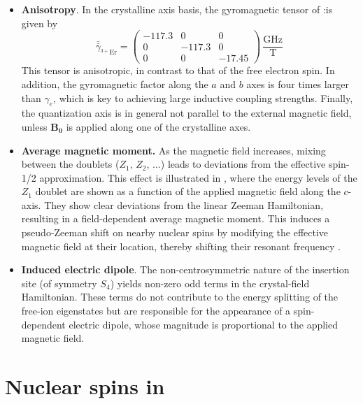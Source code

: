 \begin{itemize}
    \item \textbf{Anisotropy}. In the crystalline axis basis, the gyromagnetic tensor of \Er:\Ca is given by
    \[
         \bar{\bar{\gamma}}_{^{3+}\text{Er}} = \begin{pmatrix}
            -117.3 & 0 & 0 \\
            0 & -117.3 & 0 \\
            0 & 0 & -17.45
         \end{pmatrix}\,\frac{\text{GHz}}{\text{T}}
    \]
    This tensor is anisotropic, in contrast to that of the free electron spin. In addition, the gyromagnetic factor along the $a$ and $b$ axes is four times larger than $\gamma_e$, which is key to achieving large inductive coupling strengths. Finally, the quantization axis is in general not parallel to the external magnetic field, unless $\mathbf{B_0}$ is applied along one of the crystalline axes.
    \item \textbf{Average magnetic moment.}  As the magnetic field increases, mixing between the doublets ($Z_1,\,Z_2,\,\dots$) leads to deviations from the effective spin-1/2 approximation. This effect is illustrated in , where the energy levels of the $Z_1$ doublet are shown as a function of the applied magnetic field along the $c$-axis. They show clear deviations from the linear Zeeman Hamiltonian, resulting in a field-dependent average magnetic moment. This induces a pseudo-Zeeman shift on nearby nuclear spins by modifying the effective magnetic field at their location, thereby shifting their resonant frequency .

    \item \textbf{Induced electric dipole}. The non-centrosymmetric nature of the insertion site (of symmetry $S_4$) yields non-zero odd terms in the crystal-field Hamiltonian. These terms do not contribute to the energy splitting of the free-ion eigenstates but are responsible for the appearance of a spin-dependent electric dipole, whose magnitude is proportional to the applied magnetic field.
\end{itemize}



\section{Nuclear spins in \Ca}

